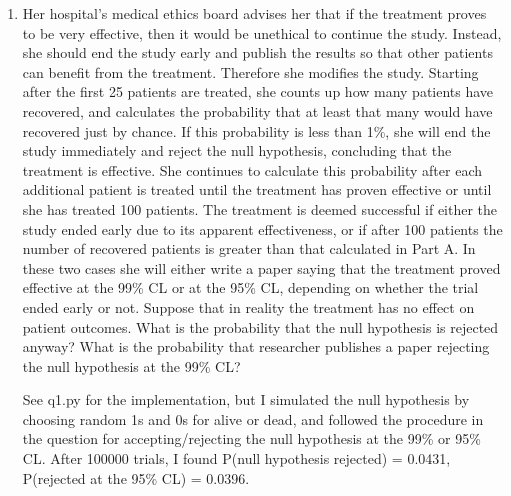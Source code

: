 \begin{enumerate}[label=\textbf{\Alph*}.]
    \item Her hospital's medical ethics board advises her that if the treatment proves to be very effective, then it would be unethical to continue the study. Instead, she should end the study early and publish the results so that other patients can benefit from the treatment. Therefore she modifies the study. Starting after the first 25 patients are treated, she counts up how many patients have recovered, and calculates the probability that at least that many would have recovered just by chance. If this probability is less than 1\%, she will end the study immediately and reject the null hypothesis, concluding that the treatment is effective. She continues to calculate this probability after each additional patient is treated until the treatment has proven effective or until she has treated 100 patients. The treatment is deemed successful if either the study ended early due to its apparent effectiveness, or if after 100 patients the number of recovered patients is greater than that calculated in Part A. In these two cases she will either write a paper saying that the treatment proved effective at the 99\% CL or at the 95\% CL, depending on whether the trial ended early or not. Suppose that in reality the treatment has no effect on patient outcomes. What is the probability that the null hypothesis is rejected anyway? What is the probability that researcher publishes a paper rejecting the null hypothesis at the 99\% CL?

    See q1.py for the implementation, but I simulated the null hypothesis by choosing random 1s and 0s for alive or dead, and followed the procedure in the question for accepting/rejecting the null hypothesis at the 99\% or 95\% CL. After 100000 trials, I found P(null hypothesis rejected) = 0.0431, P(rejected at the 95\% CL) = 0.0396.

\end{enumerate}
